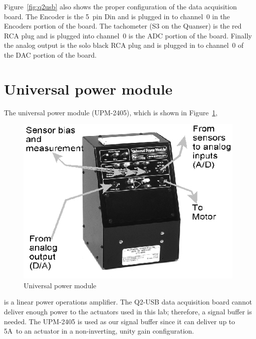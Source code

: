 Figure~\ref{fig:q2usb} also shows the proper configuration of the data
acquisition board.  The Encoder is the 5~pin Din and is plugged in to
channel~0 in the Encoders portion of the board. The tachometer (S3 on the
Quanser) is the red RCA plug and is plugged into channel~0 is the ADC
portion of the board.  Finally the analog output is the solo black RCA plug
and is plugged in to channel~0 of the DAC portion of the board.

\section{Universal power module}

The universal power module (UPM-2405), which is shown in
Figure~\ref{fig:power}\@,
\begin{figure}[htbp]
\centering
\includegraphics[width=0.6\hsize]{pix/power.jpg}
\caption{Universal power module}\label{fig:power}
\end{figure}%
is a linear power operations amplifier. The Q2-USB data acquisition board
cannot deliver enough power to the actuators used in this lab; therefore, a
signal buffer is needed.  The UPM-2405 is used as our signal buffer since it
can deliver up to 5A~to an actuator in a non-inverting, unity gain
configuration.

